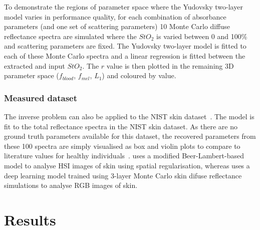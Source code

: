 
To demonstrate the regions of parameter space where the Yudovsky two-layer model varies in performance quality, for each combination of absorbance parameters (and one set of scattering parameters) 10 Monte Carlo diffuse reflectance spectra are simulated where the $StO_2$ is varied between 0 and 100\% and scattering parameters are fixed. The Yudovsky two-layer model is fitted to each of these Monte Carlo spectra and a linear regression is fitted between the extracted and input $StO_2$. The $r$ value is then plotted in the remaining 3D parameter space ($f_{blood}$, $f_{mel}$, $L_1$) and coloured by value.

\subsubsection{Measured dataset}
The inverse problem can also be applied to the NIST skin dataset~\cite{Cooksey2017}. The model is fit to the total reflectance spectra in the NIST skin dataset. As there are no ground truth parameters available for this dataset, the recovered parameters from these 100 spectra are simply visualised as box and violin plots to compare to literature values for healthy individuals~\cite{Jacques2013, VanManen2021, Nishidate2011, Lintzeri2022}. \cite{VanManen2021} uses a modified Beer-Lambert-based model to analyse HSI images of skin using spatial regularisation, whereas \cite{Nishidate2011} uses a deep learning model trained using 3-layer Monte Carlo skin difuse reflectance simulations to analyse RGB images of skin. 

\section{Results}\label{sec:results2}

